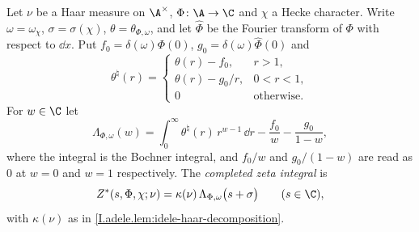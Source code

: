 Let $\nu$ be a Haar measure on $\A^\times$, $\Phi\colon\A\to\C$ and $\chi$ a Hecke character. Write
$\omega=\omega_\chi$, $\sigma=\sigma(\chi)$, $\theta=\theta_{\Phi,\omega}$, and let $\hat\Phi$ be the Fourier transform of
$\Phi$ with respect to $\dd x$. Put $f_0=\delta(\omega)\Phi(0)$, $g_0=\delta(\omega)\hat\Phi(0)$ and
\[
  \theta^\natural(r)=\begin{cases}\theta(r)-f_0,&r>1,\\ \theta(r)-g_0/r,&0<r<1,\\ 0&\text{otherwise.}\end{cases}
\]
For $w\in\C$ let
\[
  \Lambda_{\Phi,\omega}(w)=\int_0^\infty\theta^\natural(r)\,r^{w-1}\,\dd r-\frac{f_0}{w}-\frac{g_0}{1-w},
\]
where the integral is the Bochner integral, and $f_0/w$ and $g_0/(1-w)$ are read as $0$ at $w=0$ and $w=1$
respectively. The \emph{completed zeta integral} is
\[
  Z^*(s,\Phi,\chi;\nu)=\kappa(\nu)\,\Lambda_{\Phi,\omega}\bigl(s+\sigma\bigr)\qquad(s\in\C),
\]
with $\kappa(\nu)$ as in \cref{I.adele.lem:idele-haar-decomposition}.
